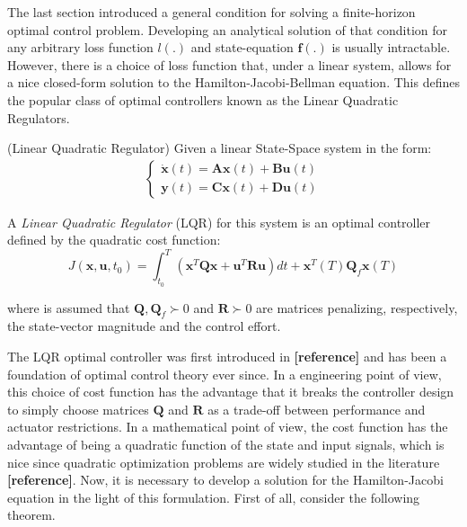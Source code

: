 \documentclass[a4paper,11pt]{book}
\numberwithin{figure}{chapter}
\numberwithin{equation}{chapter}
\numberwithin{table}{chapter}
\theoremstyle{definition}
\newtheorem{definition}{Definition}[chapter]
\newcounter{boxed-theorem}
\newcounter{boxed-definition}
\newenvironment{boxed-definition}[1]
{\begin{shaded} \begin{definition}{#1}}
{\end{definition} \end{shaded}}
\begin{document}
The last section introduced a general condition for solving a finite-horizon optimal control problem. Developing an analytical solution of that condition for any arbitrary loss function $l(.)$ and state-equation $\bm{f}(.)$ is usually intractable. However, there is a choice of loss function that, under a linear system, allows for a nice closed-form solution to the Hamilton-Jacobi-Bellman equation. This defines the popular class of optimal controllers known as the Linear Quadratic Regulators.

\begin{boxed-definition}{(Linear Quadratic Regulator)} \label{def:lqr}
	Given a linear State-Space system in the form:
	\begin{align}
	\begin{cases}
		\dot{\bm{x}}(t) = \bm{A} \bm{x}(t) + \bm{B} \bm{u}(t) \\
		\bm{y}(t) = \bm{C} \bm{x}(t) + \bm{D} \bm{u}(t)
	\end{cases}
	\end{align}
	
	A \textit{Linear Quadratic Regulator} (LQR) for this system is an optimal controller defined by the quadratic cost function:
	\begin{equation}
		J(\bm{x}, \bm{u}, t_0) = \int_{t_0}^{T} \left( \bm{x}^T \bm{Q} \bm{x} + \bm{u}^T \bm{R} \bm{u} \right) dt + \bm{x}^T(T) \bm{Q}_f \bm{x}(T)
	\end{equation}
	
	\noindent where is assumed that $\bm{Q},\bm{Q}_f  \succ 0$ and $\bm{R} \succ 0$ are matrices penalizing, respectively, the state-vector magnitude and the control effort.
\end{boxed-definition}

The LQR optimal controller was first introduced in \textbf{[reference]} and has been a foundation of optimal control theory ever since. In a engineering point of view, this choice of cost function has the advantage that it breaks the controller design to simply choose matrices $\bm{Q}$ and $\bm{R}$ as a trade-off between performance and actuator restrictions. In a mathematical point of view, the cost function has the advantage of being a quadratic function of the state and input signals, which is nice since quadratic optimization problems are widely studied in the literature \textbf{[reference]}. Now, it is necessary to develop a solution for the Hamilton-Jacobi equation in the light of this formulation. First of all, consider the following theorem.
\end{document}
